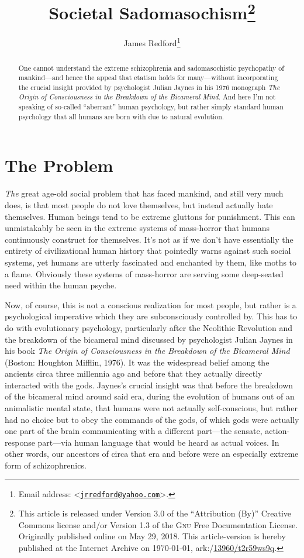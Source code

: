 \documentclass[letterpaper,12pt]{article}
\title{Societal Sadomasochism\footnote{This article is released under Version 3.0 of the ``Attribution (By)'' Creative Commons license and\slash or Version 1.3 of the \textsc{Gnu} Free Documentation License. Originally published online on May 29, 2018. This article-version is hereby published at the Internet Archive on \today , ark:/\discretionary{}{}{}\href{https://archive.org/details/Societal-Sadomasochism}{13960/\dsc t2r59ws9q}.}}
\author{James Redford\footnote{Email address: \textless\href{mailto:jrredford@yahoo.com}{\nolinkurl{jrredford@yahoo.com}}\textgreater .}}
\begin{document}
\maketitle

\renewcommand{\abstractname}{\textsc{Abstract}}
\setlength{\absparindent}{0.5em}
\begin{abstract}
One cannot understand the extreme schizophrenia and sadomasochistic psychopathy of mankind---and hence the appeal that etatism holds for many---without incorporating the crucial insight provided by psychologist Julian Jaynes in his 1976 monograph \emph{The Origin of Consciousness in the Breakdown of the Bicameral Mind}. And here I'm not speaking of so-called ``aberrant'' human psychology, but rather simply standard human psychology that all humans are born with due to natural evolution.
\end{abstract}

\section{The Problem}
\label{sec:TheProblem}

\emph{The} great age-old social problem that has faced mankind, and still very much does, is that most people do not love themselves, but instead actually hate themselves. Human beings tend to be extreme gluttons for punishment. This can unmistakably be seen in the extreme systems of mass-horror that humans continuously construct for themselves. It's not as if we don't have essentially the entirety of civilizational human history that pointedly warns against such social systems, yet humans are utterly fascinated and enchanted by them, like moths to a flame. Obviously these systems of mass-horror are serving some deep-seated need within the human psyche.

Now, of course, this is not a conscious realization for most people, but rather is a psychological imperative which they are subconsciously controlled by. This has to do with evolutionary psychology, particularly after the Neolithic Revolution and the breakdown of the bicameral mind discussed by psychologist Julian Jaynes in his book \emph{The Origin of Consciousness in the Breakdown of the Bicameral Mind} (Boston: Houghton Mifflin, 1976). It was the widespread belief among the ancients circa three millennia ago and before that they actually directly interacted with the gods. Jaynes's crucial insight was that before the breakdown of the bicameral mind around said era, during the evolution of humans out of an animalistic mental state, that humans were not actually self-conscious, but rather had no choice but to obey the commands of the gods, of which gods were actually one part of the brain communicating with a different part---the sensate, action-response part---via human language that would be heard as actual voices. In other words, our ancestors of circa that era and before were an especially extreme form of schizophrenics.
\end{document}
